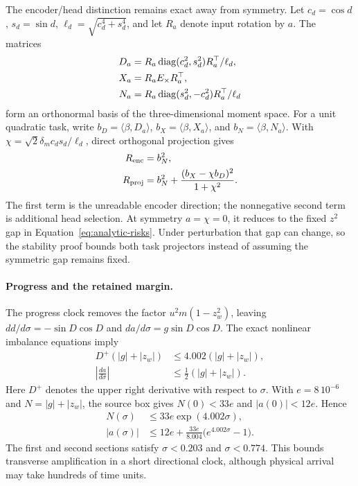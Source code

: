 The encoder/head distinction remains exact away from symmetry. Let $c_d=\cos d$, $s_d=\sin d$, $\ell_d=\sqrt{c_d^4+s_d^4}$, and let $R_a$ denote input rotation by $a$. The matrices
\begin{align}
 D_a&=R_a\operatorname{diag}(c_d^2,s_d^2)R_a^\top/\ell_d,\nonumber\\
 X_a&=R_aE_\times R_a^\top,\nonumber\\
 N_a&=R_a\operatorname{diag}(s_d^2,-c_d^2)R_a^\top/\ell_d
\end{align}
form an orthonormal basis of the three-dimensional moment space. For a unit quadratic task, write $b_D=\langle\beta,D_a\rangle$, $b_X=\langle\beta,X_a\rangle$, and $b_N=\langle\beta,N_a\rangle$. With $\chi=\sqrt2\delta_m c_ds_d/\ell_d$, direct orthogonal projection gives
\begin{align}
 R_{\rm enc}&=b_N^2,\nonumber\\
 R_{\rm proj}&=b_N^2+\frac{(b_X-\chi b_D)^2}{1+\chi^2}.
 \label{eq:asymmetric-risk-split}
\end{align}
The first term is the unreadable encoder direction; the nonnegative second term is additional head selection. At symmetry $a=\chi=0$, it reduces to the fixed $z^2$ gap in Equation~\eqref{eq:analytic-risks}. Under perturbation that gap can change, so the stability proof bounds both task projectors instead of assuming the symmetric gap remains fixed.

\paragraph{Progress and the retained margin.}
The progress clock removes the factor $u^2m(1-z_w^2)$, leaving $dd/d\sigma=-\sin D\cos D$ and $da/d\sigma=g\sin D\cos D$. The exact nonlinear imbalance equations imply
\begin{align}
 D^+(|g|+|z_w|)&\le4.002(|g|+|z_w|),\nonumber\\
 \left|\frac{da}{d\sigma}\right|
 &\le\tfrac12(|g|+|z_w|).
\end{align}
Here $D^+$ denotes the upper right derivative with respect to $\sigma$. With $e=8\,10^{-6}$ and $N=|g|+|z_w|$, the source box gives $N(0)<33e$ and $|a(0)|<12e$. Hence
\begin{align}
 N(\sigma)&\le33e\exp(4.002\sigma),\nonumber\\
 |a(\sigma)|&\le12e+\frac{33e}{8.004}\big(e^{4.002\sigma}-1\big).
\end{align}
The first and second sections satisfy $\sigma<0.203$ and $\sigma<0.774$. This bounds transverse amplification in a short directional clock, although physical arrival may take hundreds of time units.

